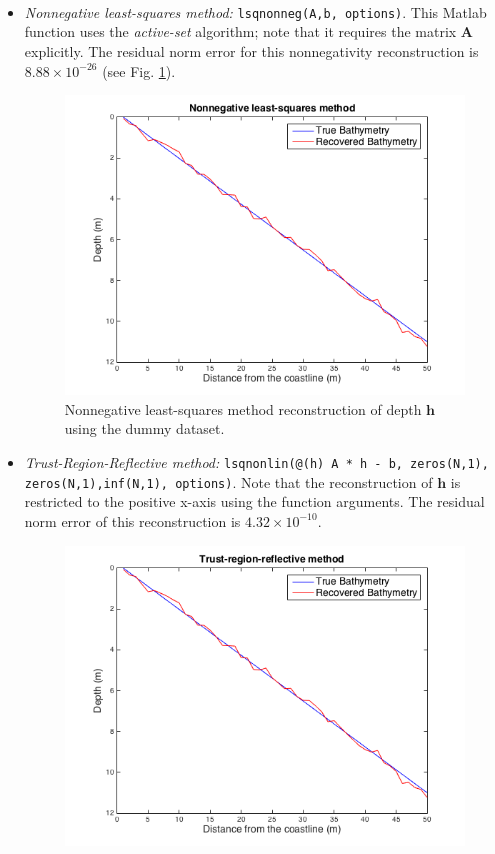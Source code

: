 \begin{itemize}
\item[(1)]  \textit{Nonnegative least-squares method:}  \verb|lsqnonneg(A,b, options)|. This Matlab\textsuperscript{\textregistered} function uses the \textit{active-set} algorithm; note that it requires the matrix $\mathbf{A}$ explicitly. The residual norm error for this nonnegativity reconstruction is $8.88 \times 10^{-26}$ (see Fig. \ref{nonLS_fig}).   \\

\begin{figure}[H]
\center
\includegraphics[scale=0.475]{img/NonLS_linear.png} 
\caption{Nonnegative least-squares method reconstruction of depth $\mathbf{h}$ using the dummy dataset.}
\label{nonLS_fig}
\end{figure}
\item[(2)]  \textit{Trust-Region-Reflective method:}  \verb|lsqnonlin(@(h) A * h - b, zeros(N,1),| \\ \verb|zeros(N,1),inf(N,1), options)|. Note that the reconstruction of $\mathbf{h}$ is restricted to the positive x-axis using the function arguments. The residual norm error of this reconstruction is $4.32 \times 10^{-10}$. 
\begin{figure}[H]
\center
\includegraphics[scale=0.6]{img/trust_region_linear.png} 

\end{figure}
\end{itemize}
